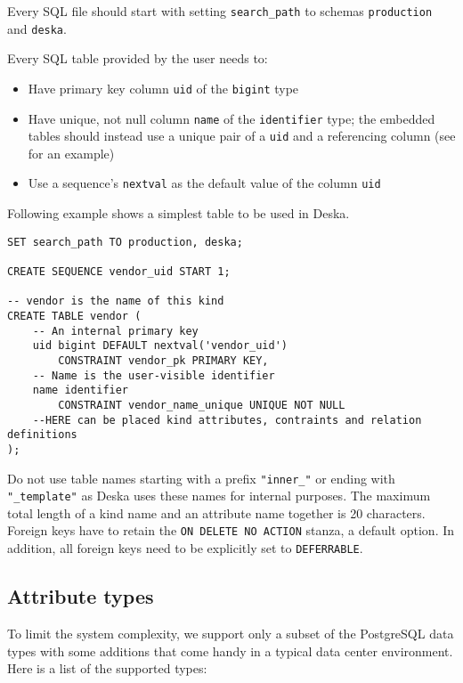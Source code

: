 \documentclass[deska]{subfiles}
\begin{document}
Every SQL file should start with setting {\tt search\_path} to schemas {\tt production} and {\tt deska}.

Every SQL table provided by the user needs to:
\begin{itemize}
    \item Have primary key column {\tt uid} of the {\tt bigint} type
    \item Have unique, not null column {\tt name} of the {\tt identifier} type; the embedded tables should instead use a
        unique pair of a {\tt uid} and a referencing column (see  for an example)
    \item Use a sequence's {\tt nextval} as the default value of the column {\tt uid}
\end{itemize}

Following example shows a simplest table to be used in Deska.

\begin{verbatim}
SET search_path TO production, deska;

CREATE SEQUENCE vendor_uid START 1;

-- vendor is the name of this kind
CREATE TABLE vendor (
    -- An internal primary key
    uid bigint DEFAULT nextval('vendor_uid')
        CONSTRAINT vendor_pk PRIMARY KEY,
    -- Name is the user-visible identifier
    name identifier
        CONSTRAINT vendor_name_unique UNIQUE NOT NULL
    --HERE can be placed kind attributes, contraints and relation definitions
);
\end{verbatim}

Do not use table names starting with a prefix {\tt "inner\_"} or ending with {\tt "\_template"} as Deska uses these
names for internal purposes.  The maximum total length of a kind name and an attribute name together is 20 characters.
Foreign keys have to retain the {\tt ON DELETE NO ACTION} stanza, a default option. In addition, all foreign keys need
to be explicitly set to {\tt DEFERRABLE}.

\subsection{Attribute types}
\label{sec:db-att-types}
To limit the system complexity, we support only a subset of the PostgreSQL data types with some additions that come
handy in a typical data center environment.  Here is a list of the supported types:
\end{document}
